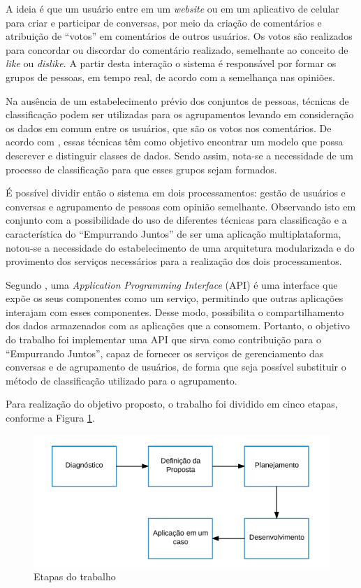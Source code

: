 A ideia é que um usuário entre em um \textit{website} ou em um aplicativo de celular para criar e participar de conversas, 
por meio da criação de comentários e atribuição de ``votos'' em comentários de outros usuários.
Os votos são realizados para concordar ou discordar do comentário realizado, semelhante ao conceito de \textit{like} ou \textit{dislike}.
A partir desta interação o sistema é responsável por formar os grupos de pessoas, em tempo real, de acordo com a semelhança nas opiniões.

Na ausência de um estabelecimento prévio dos conjuntos de pessoas, técnicas de classificação podem ser utilizadas para os agrupamentos
levando em consideração os dados em comum entre os usuários, que são os votos nos comentários.
De acordo com , essas técnicas
têm como objetivo encontrar um modelo que possa descrever e distinguir classes de dados.
Sendo assim, nota-se a necessidade de um processo de classificação para que esses grupos sejam formados.

É possível dividir então o sistema em dois processamentos: 
gestão de usuários e conversas e agrupamento de pessoas com opinião semelhante. 
Observando isto em conjunto com a possibilidade do uso de diferentes técnicas para classificação 
e a característica do ``Empurrando Juntos'' de ser uma aplicação multiplataforma, notou-se
a necessidade do estabelecimento de uma arquitetura modularizada e do provimento dos serviços necessários para a realização
dos dois processamentos.

Segundo , uma \textit{Application Programming Interface} (API)
é uma interface que expõe os seus componentes como um serviço, permitindo que outras aplicações interajam com esses 
componentes. Desse modo, possibilita o compartilhamento dos dados armazenados com as aplicações que a consomem.
Portanto, o objetivo do trabalho foi implementar uma API que sirva como contribuição para o ``Empurrando Juntos'',
capaz de fornecer os serviços de gerenciamento das conversas e de agrupamento de usuários, de forma que seja possível substituir
o método de classificação utilizado para o agrupamento.

Para realização do objetivo proposto, o trabalho foi dividido em cinco etapas, conforme a Figura \ref{fig:etapas_trabalho}. 

\begin{figure}[h!]
\centering
\includegraphics[scale=0.6]{figuras/etapas.png}
\caption{Etapas do trabalho}
\label{fig:etapas_trabalho}
\end{figure}

